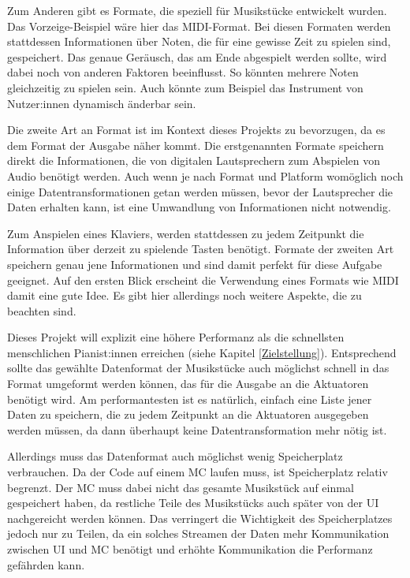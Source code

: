 Zum Anderen gibt es Formate, die speziell für Musikstücke entwickelt wurden.
Das Vorzeige-Beispiel wäre hier das MIDI-Format.
Bei diesen Formaten werden stattdessen Informationen über Noten, die für eine gewisse Zeit zu spielen sind, gespeichert.
Das genaue Geräusch, das am Ende abgespielt werden sollte, wird dabei noch von anderen Faktoren beeinflusst.
So könnten mehrere Noten gleichzeitig zu spielen sein.
Auch könnte zum Beispiel das Instrument von Nutzer:innen dynamisch änderbar sein.

Die zweite Art an Format ist im Kontext dieses Projekts zu bevorzugen, da es dem Format der Ausgabe näher kommt.
Die erstgenannten Formate speichern direkt die Informationen, die von digitalen Lautsprechern zum Abspielen von Audio benötigt werden.
Auch wenn je nach Format und Platform womöglich noch einige Datentransformationen getan werden müssen, bevor der Lautsprecher die Daten erhalten kann, ist eine Umwandlung von Informationen nicht notwendig.

Zum Anspielen eines Klaviers, werden stattdessen zu jedem Zeitpunkt die Information über derzeit zu spielende Tasten benötigt.
Formate der zweiten Art speichern genau jene Informationen und sind damit perfekt für diese Aufgabe geeignet.
Auf den ersten Blick erscheint die Verwendung eines Formats wie MIDI damit eine gute Idee.
Es gibt hier allerdings noch weitere Aspekte, die zu beachten sind.

Dieses Projekt will explizit eine höhere Performanz als die schnellsten menschlichen Pianist:innen erreichen (siehe Kapitel \ref*{Zielstellung}).
Entsprechend sollte das gewählte Datenformat der Musikstücke auch möglichst schnell in das Format umgeformt werden können, das für die Ausgabe an die Aktuatoren benötigt wird.
Am performantesten ist es natürlich, einfach eine Liste jener Daten zu speichern, die zu jedem Zeitpunkt an die Aktuatoren ausgegeben werden müssen, da dann überhaupt keine Datentransformation mehr nötig ist.

Allerdings muss das Datenformat auch möglichst wenig Speicherplatz verbrauchen.
Da der Code auf einem \ac{MC} laufen muss, ist Speicherplatz relativ begrenzt.
Der \ac{MC} muss dabei nicht das gesamte Musikstück auf einmal gespeichert haben, da restliche Teile des Musikstücks auch später von der \ac{UI} nachgereicht werden können.
Das verringert die Wichtigkeit des Speicherplatzes jedoch nur zu Teilen, da ein solches Streamen der Daten mehr Kommunikation zwischen \ac{UI} und {MC} benötigt und erhöhte Kommunikation die Performanz gefährden kann.

